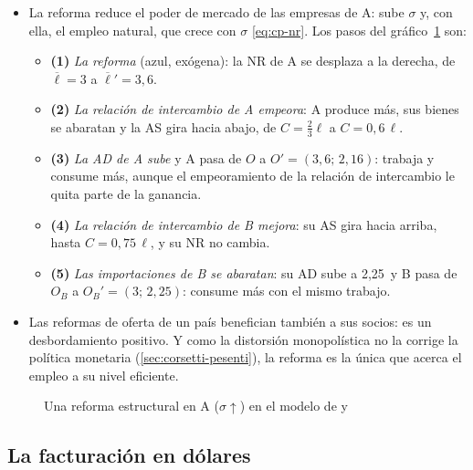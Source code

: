 \documentclass[11pt]{article}
\begin{document}
\begin{itemize}
\item La reforma reduce el poder de mercado de las empresas de A: sube $\sigma$ y, con ella, el empleo natural, que crece con $\sigma$ \eqref{eq:cp-nr}. Los pasos del gráfico~\ref{fig:cp-reforma} son:
  \begin{itemize}
  \item \textbf{(1)} \emph{La reforma} (azul, exógena): la NR de A se desplaza a la derecha, de $\overline{\ell}=3$ a $\overline{\ell}'=3{,}6$.
  \item \textbf{(2)} \emph{La relación de intercambio de A empeora}: A produce más, sus bienes se abaratan y la AS gira hacia abajo, de $C=\tfrac{2}{3}\ell$ a $C=0{,}6\,\ell$.
  \item \textbf{(3)} \emph{La AD de A sube} y A pasa de $O$ a $O'=(3{,}6;\,2{,}16)$: trabaja y consume más, aunque el empeoramiento de la relación de intercambio le quita parte de la ganancia.
  \item \textbf{(4)} \emph{La relación de intercambio de B mejora}: su AS gira hacia arriba, hasta $C=0{,}75\,\ell$, y su NR no cambia.
  \item \textbf{(5)} \emph{Las importaciones de B se abaratan}: su AD sube a 2,25~y B pasa de $O_B$ a $O_B'=(3;\,2{,}25)$: consume más con el mismo trabajo.
  \end{itemize}
\item Las reformas de oferta de un país benefician también a sus socios: es un desbordamiento positivo\nocite{CorsettiPesenti2009}. Y como la distorsión monopolística no la corrige la política monetaria (\ref{sec:corsetti-pesenti}), la reforma es la única que acerca el empleo a su nivel eficiente.
\end{itemize}

\begin{figure}[H]
\centering
\caption{Una reforma estructural en A ($\sigma\uparrow$) en el modelo de  y }\label{fig:cp-reforma}
\end{figure}

\subsection*{La facturación en dólares}
\end{document}
